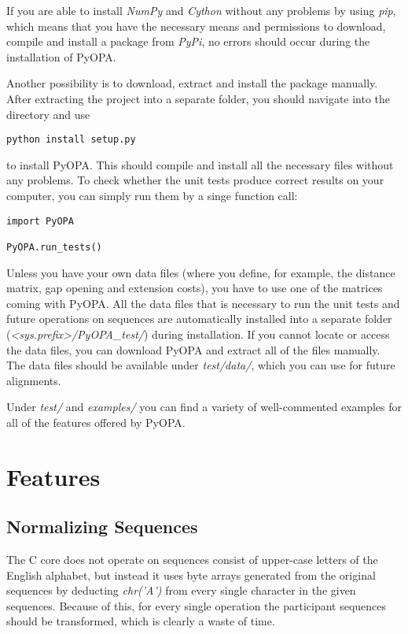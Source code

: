 \documentclass[12pt]{article}
\newcommand{\pp}{PyOPA}
\begin{document}
If you are able to install \emph{NumPy} and \emph{Cython} without any problems by using \emph{pip}, which means that you have the necessary means and permissions to download, compile and install a package from \emph{PyPi}, no errors should occur during the installation of \pp{}.

Another possibility is to download, extract and install the package manually. After extracting the project into a separate folder, you should navigate into the directory and use

\begin{lstlisting}
python install setup.py
\end{lstlisting}

to install \pp{}. This should compile and install all the necessary files without any problems. To check whether the unit tests produce correct results on your computer, you can simply run them by a singe function call:
\begin{lstlisting}
import PyOPA

PyOPA.run_tests()
\end{lstlisting}

Unless you have your own data files (where you define, for example, the distance matrix, gap opening and extension costs), you have to use one of the matrices coming with \pp{}. All the data files that is necessary to run the unit tests and future operations on sequences are automatically installed into a separate folder (\emph{\textless{}sys.prefix\textgreater/\pp{}\_test/}) during installation. If you cannot locate or access the data files, you can download \pp{} and extract all of the files manually. The data files should be available under \emph{test/data/}, which you can use for future alignments. 

Under \emph{test/} and \emph{examples/} you can find a variety of well-commented examples for all of the features offered by \pp{}.

\section{Features}
\label{sec:features}

\subsection{Normalizing Sequences}
\label{subsec:normseq}
The C core does not operate on sequences consist of upper-case letters of the English alphabet, but instead it uses byte arrays generated from the original sequences by deducting \emph{chr('A')} from every single character in the given sequences. Because of this, for every single operation the participant sequences should be transformed, which is clearly a waste of time.
\end{document}
